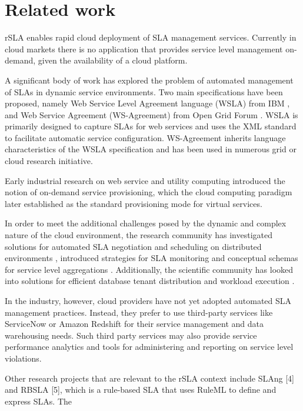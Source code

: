 \section{Related work}
rSLA enables rapid cloud deployment of SLA management services. Currently in cloud markets there is no application that provides service level management on-demand, given the availability of a cloud platform.

A significant body of work has explored the problem of automated management of SLAs in dynamic service environments. Two main specifications have been proposed, namely Web Service Level Agreement language (WSLA) from IBM \cite{wsla}, and Web Service Agreement (WS-Agreement) from Open Grid Forum \cite{wsag}. WSLA is primarily designed to capture SLAs for web services and uses the XML standard to facilitate automatic service configuration. WS-Agreement inherits language characteristics of the WSLA specification and has been used in numerous grid or cloud research initiative\cite{soi, butler, cslam}. 




Early industrial research on web service and utility computing \cite{ludwig, IBM1, dan} introduced the notion of on-demand service provisioning, which the cloud computing paradigm later established as the standard provisioning mode for virtual services.

In order to meet the additional challenges posed by the dynamic and complex nature of the cloud environment, the research community has investigated solutions for automated SLA negotiation and scheduling on distributed environments \cite{SNAP, czaj, lessons}, introduced strategies for SLA monitoring \cite{rana} and conceptual schemas for service level aggregations \cite{ulhaq}.
Additionally, the scientific community has looked into solutions for efficient database tenant distribution and workload execution \cite{kraska, nec, sakr}. 

In the industry, however, cloud providers have not yet adopted automated SLA management practices. Instead, they prefer to use third-party services like ServiceNow \cite{servicenow} or Amazon Redshift \cite{redshift} for their service management and data warehousing needs. Such third party services may also provide service performance analytics and tools for administering and reporting on service level violations.

Other research projects that are relevant to the rSLA context include SLAng [4] and RBSLA [5], which is a rule-based SLA that uses RuleML to define and express SLAs. The 


